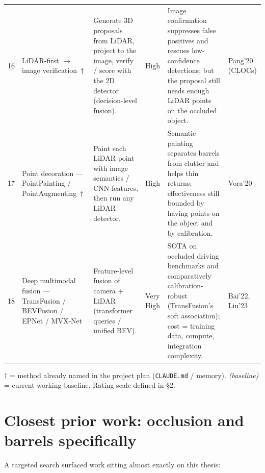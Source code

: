 \documentclass[10pt,a4paper]{article}
\newcommand{\stars}[1]{%
  \ifcase#1\or
  \ding{72}\ding{73}\ding{73}\ding{73}\ding{73}\or
  \ding{72}\ding{72}\ding{73}\ding{73}\ding{73}\or
  \ding{72}\ding{72}\ding{72}\ding{73}\ding{73}\or
  \ding{72}\ding{72}\ding{72}\ding{72}\ding{73}\or
  \ding{72}\ding{72}\ding{72}\ding{72}\ding{72}\fi}
\begin{document}
\begin{landscape}
\begin{longtable}{@{}R{0.5cm} R{3.3cm} R{6.7cm} R{2.2cm} R{7.0cm} R{2.5cm}@{}}
16 & LiDAR-first $\to$ image verification~$\dagger$ &
Generate 3D proposals from LiDAR, project to the image, verify / score with the 2D detector (decision-level fusion). &
\stars{4}\newline High &
Image confirmation suppresses false positives and rescues low-confidence detections; but the proposal still needs enough LiDAR points on the occluded object. &
Pang'20 (CLOCs)\\

17 & Point decoration --- PointPainting / PointAugmenting~$\dagger$ &
Paint each LiDAR point with image semantics / CNN features, then run any LiDAR detector. &
\stars{4}\newline High &
Semantic painting separates barrels from clutter and helps thin returns; effectiveness still bounded by having points on the object and by calibration. &
Vora'20\\

18 & Deep multimodal fusion --- TransFusion / BEVFusion / EPNet / MVX-Net &
Feature-level fusion of camera + LiDAR (transformer queries / unified BEV). &
\stars{5}\newline Very High &
SOTA on occluded driving benchmarks and comparatively calibration-robust (TransFusion's soft association); cost = training data, compute, integration complexity. &
Bai'22, Liu'23\\

\end{longtable}

\vspace{2pt}
{\footnotesize $\dagger$ = method already named in the project plan (\texttt{CLAUDE.md} / memory). \quad
\emph{(baseline)} = current working baseline. \quad Rating scale defined in \S2.}
\end{landscape}

\section{Closest prior work: occlusion and barrels specifically}

A targeted search surfaced work sitting almost exactly on this thesis:
\end{document}
